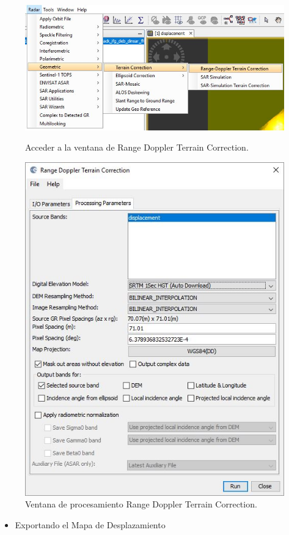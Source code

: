 \documentclass{article}
\begin{document}
\begin{figure}[htbp]
\begin{minipage}[b]{0.6\linewidth}
\centering
\includegraphics[width=\linewidth]{Imagen/20.JPG}
\caption{Acceder a la ventana de Range Doppler Terrain Correction.}
\label{fig:figura20}
\end{minipage}
\hspace{0.5cm}
\begin{minipage}[b]{0.4\linewidth}
\centering
\includegraphics[width=\linewidth]{Imagen/21.JPG}
\caption{Ventana de procesamiento Range Doppler Terrain Correction.}
\label{fig:figura21}
\end{minipage}
\end{figure}
    \begin{itemize}
    \item Exportando el Mapa de Desplazamiento
    \end{itemize}
    
\end{document}
